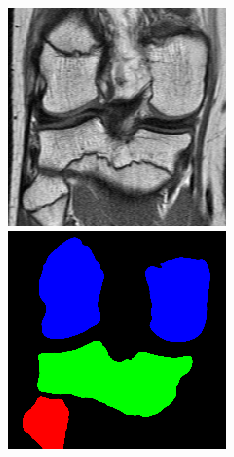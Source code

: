 \begin{figure}[H]
\endminipage
\vspace{0.15cm}
  \includegraphics[width=\linewidth]{imgs/a4.png}
\endminipage\hfill
{}
  \includegraphics[width=\linewidth]{imgs/b4.png}

\end{figure}
